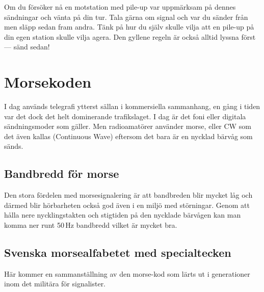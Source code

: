 Om du försöker nå en motstation med pile-up var uppmärksam på dennes sändningar
och vänta på din tur. Tala gärna om signal och var du sänder från men släpp
sedan fram andra. Tänk på hur du själv skulle vilja att en pile-up på din egen
station skulle vilja agera. Den gyllene regeln är också alltid lyssna först ---
sänd sedan!

\clearpage

\section{Morsekoden}

I dag används telegrafi ytterst sällan i kommersiella sammanhang, en gång i
tiden var det dock det helt dominerande trafikslaget. I dag är det foni eller
digitala sändningsmoder som gäller. Men radioamatörer använder morse, eller CW
som det även kallas (Continuous Wave) eftersom det bara är en nycklad bärvåg
som sänds.

\subsection{Bandbredd för morse}

Den stora fördelen med morsesignalering är att bandbreden blir mycket låg och
därmed blir hörbarheten också god även i en miljö med störningar. Genom att
hålla nere nycklingstakten och stigtiden på den nycklade bärvågen kan man
komma ner runt 50\,Hz bandbredd vilket är mycket bra.

\subsection{Svenska morsealfabetet med specialtecken}
Här kommer en sammanställning av den morse-kod som lärts ut i
generationer inom det militära för signalister.

